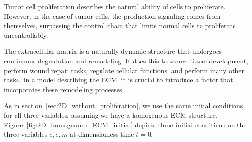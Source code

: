 Tumor cell proliferation describes the natural ability of cells to proliferate. However, in the case of tumor cells, the production signaling comes from themselves, surpassing the control chain that limits normal cells to proliferate uncontrollably.

The extracellular matrix is a naturally dynamic structure that undergoes continuous degradation and remodeling. It does this to secure tissue development, perform wound repair tasks, regulate cellular functions, and perform many other tasks. In a model describing the ECM, it is crucial to introduce a factor that incorporates these remodeling processes.

As in section~\ref{sec:2D_without_proliferation}, we use the same initial conditions for all three variables, assuming we have a homogenous ECM structure. Figure~\ref{fig:2D_homogenous_ECM_initial} depicts these initial conditions on the three variables $c,e,m$ at dimensionless time $t=0$.
